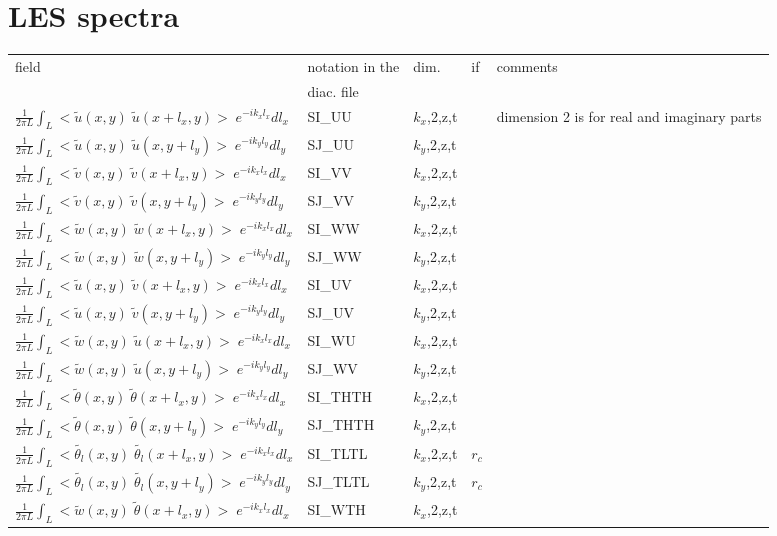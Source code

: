 \section{LES spectra}
\begin{center}
\begin{makeimage}
\begin{tabular}{||p{6cm}|>{\centering}p{2.5cm}|>{\centering}p{1.5cm}|>{\centering}p{0.5cm}|p{5cm }||}
\hline
\hline
field & notation in the & dim. &  if  & comments\\
& diac. file &           &  & \\
\hline
\hline
$\frac{1}{2\pi L}\int_L<\tilde{u}(x,y)\;\tilde{u}(x+l_x,y)>\;e^{-ik_xl_x}dl_x$ & SI\_UU & $k_x$,2,z,t & &\multirow{30}{5cm}{ dimension 2 is for real and imaginary parts}\\
\cline{1-4}
$\frac{1}{2\pi L}\int_L<\tilde{u}(x,y)\;\tilde{u}(x,y+l_y)>\;e^{-ik_yl_y}dl_y$ & SJ\_UU & $k_y$,2,z,t & & \\
\cline{1-4}
$\frac{1}{2\pi L}\int_L<\tilde{v}(x,y)\;\tilde{v}(x+l_x,y)>\;e^{-ik_xl_x}dl_x$ & SI\_VV & $k_x$,2,z,t & & \\
\cline{1-4}
$\frac{1}{2\pi L}\int_L<\tilde{v}(x,y)\;\tilde{v}(x,y+l_y)>\;e^{-ik_yl_y}dl_y$ & SJ\_VV & $k_y$,2,z,t & & \\
\cline{1-4}
$\frac{1}{2\pi L}\int_L<\tilde{w}(x,y)\;\tilde{w}(x+l_x,y)>\;e^{-ik_xl_x}dl_x$ & SI\_WW & $k_x$,2,z,t & & \\
\cline{1-4}
$\frac{1}{2\pi L}\int_L<\tilde{w}(x,y)\;\tilde{w}(x,y+l_y)>\;e^{-ik_yl_y}dl_y$ & SJ\_WW & $k_y$,2,z,t & & \\
\cline{1-4}
$\frac{1}{2\pi L}\int_L<\tilde{u}(x,y)\;\tilde{v}(x+l_x,y)>\;e^{-ik_xl_x}dl_x$ & SI\_UV & $k_x$,2,z,t & & \\
\cline{1-4}
$\frac{1}{2\pi L}\int_L<\tilde{u}(x,y)\;\tilde{v}(x,y+l_y)>\;e^{-ik_yl_y}dl_y$ & SJ\_UV & $k_y$,2,z,t & & \\
\cline{1-4}
$\frac{1}{2\pi L}\int_L<\tilde{w}(x,y)\;\tilde{u}(x+l_x,y)>\;e^{-ik_xl_x}dl_x$ & SI\_WU & $k_x$,2,z,t & & \\
\cline{1-4}
$\frac{1}{2\pi L}\int_L<\tilde{w}(x,y)\;\tilde{u}(x,y+l_y)>\;e^{-ik_yl_y}dl_y$ & SJ\_WV & $k_y$,2,z,t & & \\
\cline{1-4}
$\frac{1}{2\pi L}\int_L<\tilde{\theta}(x,y)\;\tilde{\theta}(x+l_x,y)>\;e^{-ik_xl_x}dl_x$ & SI\_THTH & $k_x$,2,z,t & & \\
\cline{1-4}
$\frac{1}{2\pi L}\int_L<\tilde{\theta}(x,y)\;\tilde{\theta}(x,y+l_y)>\;e^{-ik_yl_y}dl_y$ & SJ\_THTH & $k_y$,2,z,t & & \\
\cline{1-4}
$\frac{1}{2\pi L}\int_L<\tilde{\theta_l}(x,y)\;\tilde{\theta_l}(x+l_x,y)>\;e^{-ik_xl_x}dl_x$ & SI\_TLTL & $k_x$,2,z,t & $r_c$ & \\
\cline{1-4}
$\frac{1}{2\pi L}\int_L<\tilde{\theta_l}(x,y)\;\tilde{\theta_l}(x,y+l_y)>\;e^{-ik_yl_y}dl_y$ & SJ\_TLTL & $k_y$,2,z,t &  $r_c$ & \\
\cline{1-4}
$\frac{1}{2\pi L}\int_L<\tilde{w}(x,y)\;\tilde{\theta}(x+l_x,y)>\;e^{-ik_xl_x}dl_x$ & SI\_WTH & $k_x$,2,z,t & & \\
\hline
\hline
\end{tabular}
\end{makeimage}
\end{center}
